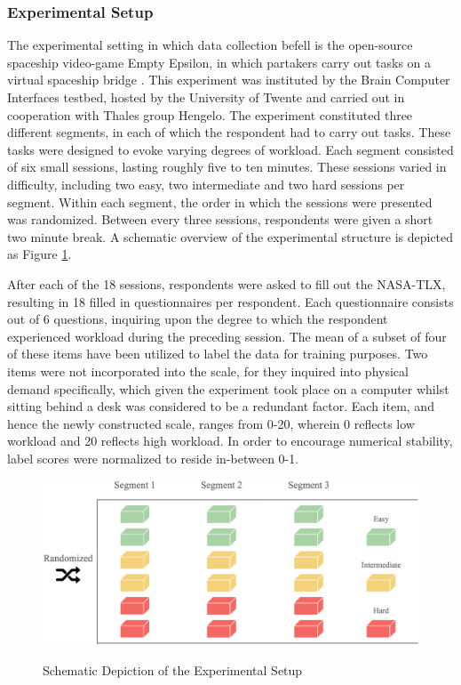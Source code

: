 \documentclass[12pt]{article}
\begin{document}
\subsubsection{Experimental Setup}
The experimental setting in which data collection befell is the open-source spaceship video-game Empty Epsilon, in which partakers carry out tasks on a virtual spaceship bridge \cite{daid2016empty}. This experiment was instituted by the Brain Computer Interfaces testbed, hosted by the University of Twente and carried out in cooperation with Thales group Hengelo. The experiment constituted three different segments, in each of which the respondent had to carry out tasks. These tasks were designed to evoke varying degrees of workload. Each segment consisted of six small sessions, lasting roughly five to ten minutes. These sessions varied in difficulty, including two easy, two intermediate and two hard sessions per segment. Within each segment, the order in which the sessions were presented was randomized. Between every three sessions, respondents were given a short two minute break. A schematic overview of the experimental structure is depicted as Figure \ref{fig:experimental}. 

After each of the 18 sessions, respondents were asked to fill out the NASA-TLX, resulting in 18 filled in questionnaires per respondent. Each questionnaire consists out of 6 questions, inquiring upon the degree to which the respondent experienced workload during the preceding session. The mean of a subset of four of these items have been utilized to label the data for training purposes.  Two items were not incorporated into the scale, for they inquired into physical demand specifically, which given the experiment took place on a computer whilst sitting behind a desk was considered to be a redundant factor. Each item, and hence the newly constructed scale, ranges from 0-20, wherein 0 reflects low workload and 20 reflects high workload.  In order to encourage numerical stability, label scores were normalized to reside in-between 0-1. 

\begin{figure}
\caption{Schematic Depiction of the Experimental Setup}
\bigskip
\includegraphics[scale=0.35]{experimental_setup}
\label{fig:experimental}
\bigskip
\end{figure}
\end{document}
